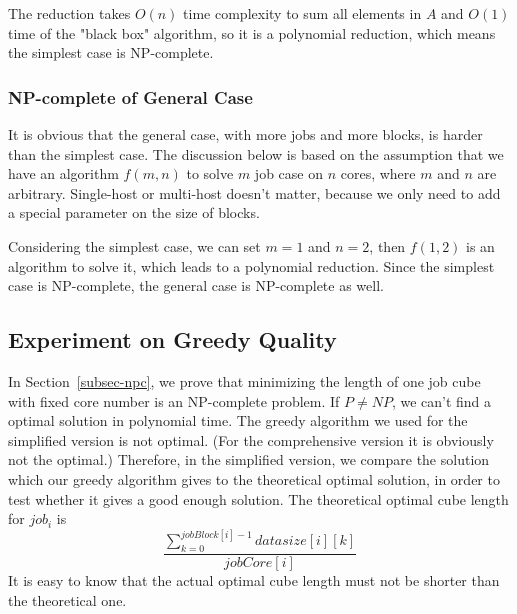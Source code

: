 \documentclass{llncs}
\begin{document}
	The reduction takes $O(n)$ time complexity to sum all elements in $A$ and $O(1)$ time of the "black box" algorithm, so it is a polynomial reduction, which means the simplest case is NP-complete.
	
	\subsubsection{NP-complete of General Case}
	It is obvious that the general case, with more jobs and more blocks, is harder than the simplest case. The discussion below is based on the assumption that we have an algorithm $f(m, n)$ to solve $m$ job case on $n$ cores, where $m$ and $n$ are arbitrary. Single-host or multi-host doesn't matter, because we only need to add a special parameter on the size of blocks.
	
	Considering the simplest case, we can set $m = 1$ and $n = 2$, then $f(1, 2)$ is an algorithm to solve it, which leads to a polynomial reduction. Since the simplest case is NP-complete, the general case is NP-complete as well.
	
	
	\subsection{Experiment on Greedy Quality}
	In Section~\ref{subsec-npc}, we prove that minimizing the length of one job cube with fixed core number is an NP-complete problem. If $P\neq NP$, we can't find a optimal solution in polynomial time. The greedy algorithm we used for the simplified version is not optimal. (For the comprehensive version it is obviously not the optimal.) Therefore, in the simplified version, we compare the solution which our greedy algorithm gives to the theoretical optimal solution, in order to test whether it gives a good enough solution. 
	The theoretical optimal cube length for $job_i$ is 
	$$
	\frac{\sum_{k = 0}^{jobBlock[i]-1} datasize[i][k]}{jobCore[i]}
	$$
	It is easy to know that the actual optimal cube length must not be shorter than the theoretical one. 
	
\end{document}
